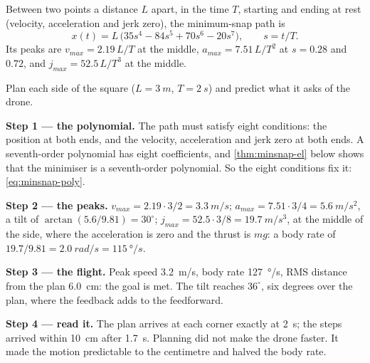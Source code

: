 \begin{result}
Between two points a distance $L$ apart, in the time $T$, starting and ending at rest (velocity, acceleration and jerk zero), the minimum-snap path is
\begin{equation}\label{eq:minsnap-poly}
  x(t) = L\,\big(35s^4 - 84s^5 + 70s^6 - 20s^7\big), \qquad s = t/T .
\end{equation}
Its peaks are $v_{max} = 2.19\,L/T$ at the middle, $a_{max} = 7.51\,L/T^2$ at $s = 0.28$ and $0.72$, and $j_{max} = 52.5\,L/T^3$ at the middle.
\end{result}

\begin{example}
\label{ex:minsnap-plan}
Plan each side of the square ($L = \SI{3}{m}$, $T = \SI{2}{s}$) and predict what it asks of the drone.

\textbf{Step 1 — the polynomial.} The path must satisfy eight conditions: the position at both ends, and the velocity, acceleration and jerk zero at both ends. A seventh-order polynomial has eight coefficients, and \cref{thm:minsnap-el} below shows that the minimiser is a seventh-order polynomial. So the eight conditions fix it: \cref{eq:minsnap-poly}.

\textbf{Step 2 — the peaks.} $v_{max} = 2.19 \cdot 3/2 = \SI{3.3}{m/s}$; $a_{max} = 7.51 \cdot 3/4 = \SI{5.6}{m/s^2}$, a tilt of $\arctan(5.6/9.81) = 30^\circ$; $j_{max} = 52.5 \cdot 3/8 = \SI{19.7}{m/s^3}$, at the middle of the side, where the acceleration is zero and the thrust is $mg$: a body rate of $19.7/9.81 = \SI{2.0}{rad/s} = \SI{115}{\degree/s}$.

\textbf{Step 3 — the flight.} Peak speed \SI{3.2}{m/s}, body rate \SI{127}{\degree/s}, RMS distance from the plan \SI{6.0}{cm}: the goal is met. The tilt reaches $36^\circ$, six degrees over the plan, where the feedback adds to the feedforward.

\textbf{Step 4 — read it.} The plan arrives at each corner exactly at \SI{2}{s}; the steps arrived within \SI{10}{cm} after \SI{1.7}{s}. Planning did not make the drone faster. It made the motion predictable to the centimetre and halved the body rate.
\end{example}


